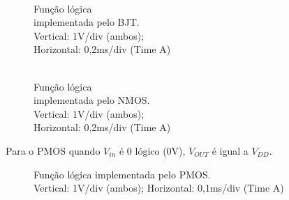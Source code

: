 \documentclass[pdftex,12pt,a4paper]{report}
\begin{document}
\begin{figure}[!htb]
  \centerline{}
  \caption{\\Função lógica \\implementada pelo BJT. \\Vertical: 1V/div (ambos); \\Horizontal: 0,2ms/div (Time A)}\label{bjt}
\endminipage\hfill
{}
  \centerline{}
  \caption{\\Função lógica \\implementada pelo NMOS. \\Vertical: 1V/div (ambos); \\Horizontal: 0,2ms/div (Time A)}\label{fig:nmos}
\endminipage\hfill
\end{figure}

\newpage
Para o PMOS quando $V_{in}$ é 0 lógico (0V), $V_{OUT}$ é igual a $V_{DD}$.

\begin{figure}[h]
  \centerline{}
  \caption{Função lógica implementada pelo PMOS. \\Vertical: 1V/div (ambos); Horizontal: 0,1ms/div (Time A)}\label{cmos}
\end{figure}
\end{document}
